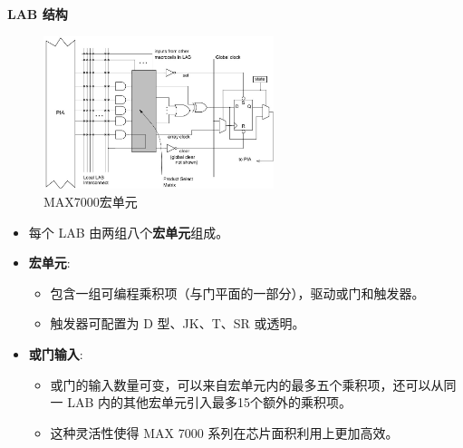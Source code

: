 \begin{frame}[allowframebreaks]{\textbf{LAB 结构}}

    \begin{figure}
    \centering
    \includegraphics[width=0.6\textwidth]{img1/MAX7000Macrocell.jpeg}
    \caption{MAX7000宏单元}
    \end{figure}

    \begin{itemize}
    \tightlist
    \item
    每个 LAB 由两组八个\textbf{宏单元}组成。
    \item
    \textbf{宏单元}:

    \begin{itemize}
    \tightlist
    \item
        包含一组可编程乘积项（与门平面的一部分），驱动或门和触发器。
    \item
        触发器可配置为 D 型、JK、T、SR 或透明。
    \end{itemize}
    \item
    \textbf{或门输入}:

    \begin{itemize}
    \tightlist
    \item
        或门的输入数量可变，可以来自宏单元内的最多五个乘积项，还可以从同一
        LAB 内的其他宏单元引入最多15个额外的乘积项。
    \item
        这种灵活性使得 MAX 7000 系列在芯片面积利用上更加高效。
    \end{itemize}
    \end{itemize}
\end{frame}

